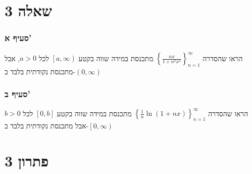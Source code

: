 \documentclass[12pt, titlepage]{article}
\begin{document}
\part*{שאלה 3}
\section*{סעיף א'}
הראו שהסדרה $\left\{\frac{nx}{1+n^2x^2}\right\}_{n=1}^\infty$ מתכנסת במידה שווה בקטע $\left[a,\infty\right)$ לכל $a>0$, אבל מתכנסת נקודתית בלבד ב-$\left(0,\infty\right)$
\section*{סעיף ב'}
הראו שהסדרה $\left\{\frac{1}{n}\ln\left(1+nx\right)\right\}^\infty_{n=1}$ מתכנסת במידה שווה בקטע $\left[0,b\right]$ לכל $b>0$ אבל מתכנסת נקודתית בלבד ב-$\left[0,\infty\right)$
\part*{פתרון 3}
\end{document}
